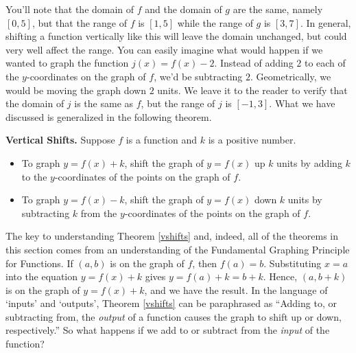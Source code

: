 You'll note that the domain of $f$ and the domain of $g$ are the same, namely $[0,5]$, but that the range of $f$ is $[1,5]$ while the range of $g$ is $[3,7]$.  In general, shifting a function vertically like this will leave the domain unchanged, but could very well affect the range.  You can easily imagine what would happen if we wanted to graph the function $j(x) = f(x) - 2$.  Instead of adding $2$ to each of the $y$-coordinates on the graph of $f$, we'd be subtracting $2$.  Geometrically, we would be moving the graph down $2$ units.  We leave it to the reader to verify that the domain of $j$ is the same as $f$, but the range of $j$ is $[-1,3]$.  What we have discussed is generalized in the following theorem.

\smallskip

\colorbox{ResultColor}{\bbm


\begin{thm} \label{vshifts}\textbf{Vertical Shifts.} Suppose $f$ is a function and $k$ is a positive number. 

\begin{itemize}

\item To graph $y=f(x)+k$, shift the graph of $y=f(x)$ up $k$ units by adding $k$ to the $y$-coordinates of the points on the graph of $f$.

\item To graph $y=f(x)-k$, shift the graph of $y=f(x)$ down $k$ units by subtracting $k$ from the $y$-coordinates of the points on the graph of $f$.

\end{itemize}

\end{thm}

\ebm}

\smallskip

The key to understanding Theorem \ref{vshifts} and, indeed, all of the theorems in this section comes from an  understanding of the Fundamental Graphing Principle for Functions.  If $(a,b)$ is on the graph of $f$, then $f(a) = b$.  Substituting $x=a$ into the equation  $y=f(x)+k$ gives $y=f(a)+k = b+k$.  Hence, $(a,b+k)$ is on the graph of $y=f(x)+k$, and we have the result.  In the language of `inputs' and `outputs', Theorem \ref{vshifts} can be paraphrased as ``Adding to, or subtracting from, the \textit{output} of a function causes the graph to shift up or down, respectively.''   So what happens if we add to or subtract from the \textit{input} of the function?  

